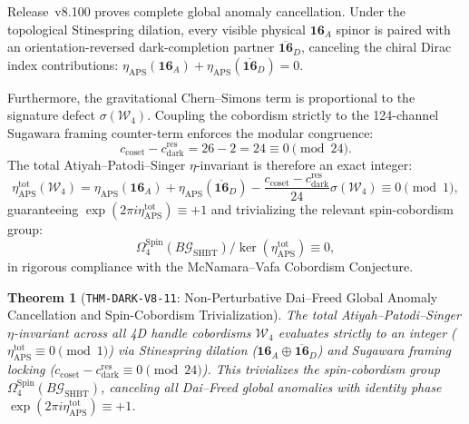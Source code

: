 \documentclass[11pt,onecolumn]{article}
\newtheorem{theorem}{Theorem}
\begin{document}
Release~v8.100 proves complete global anomaly cancellation. Under the topological Stinespring dilation, every visible physical $\mathbf{16}_A$ spinor is paired with an orientation-reversed dark-completion partner $\overline{\mathbf{16}}_D$, canceling the chiral Dirac index contributions: $\eta_{\text{APS}}(\mathbf{16}_A) + \eta_{\text{APS}}(\overline{\mathbf{16}}_D) = 0$.

Furthermore, the gravitational Chern--Simons term is proportional to the signature defect $\sigma(\mathcal{W}_4)$. Coupling the cobordism strictly to the 124-channel Sugawara framing counter-term enforces the modular congruence:
\begin{equation}
c_{\text{coset}} - c_{\text{dark}}^{\text{res}} = 26 - 2 = 24 \equiv 0 \pmod{24}.
\label{eq:v8_49}
\end{equation}
The total Atiyah--Patodi--Singer $\eta$-invariant is therefore an exact integer:
\begin{equation}
\eta_{\text{APS}}^{\text{tot}}(\mathcal{W}_4) = \eta_{\text{APS}}(\mathbf{16}_A) + \eta_{\text{APS}}(\overline{\mathbf{16}}_D) - \frac{c_{\text{coset}} - c_{\text{dark}}^{\text{res}}}{24}\sigma(\mathcal{W}_4) \equiv 0 \pmod 1,
\label{eq:v8_50}
\end{equation}
guaranteeing $\exp(2\pi i \eta_{\text{APS}}^{\text{tot}}) \equiv +1$ and trivializing the relevant spin-cobordism group:
\begin{equation}
\Omega_4^{\text{Spin}}(B\mathcal{G}_{\text{SHBT}}) / \ker(\eta_{\text{APS}}^{\text{tot}}) \equiv 0,
\label{eq:v8_51}
\end{equation}
in rigorous compliance with the McNamara--Vafa Cobordism Conjecture.

\begin{theorem}[\texttt{THM-DARK-V8-11}: Non-Perturbative Dai--Freed Global Anomaly Cancellation and Spin-Cobordism Trivialization]
\label{thm:dark_v8_11}
The total Atiyah--Patodi--Singer $\eta$-invariant across all 4D handle cobordisms $\mathcal{W}_4$ evaluates strictly to an integer ($\eta_{\text{APS}}^{\text{tot}} \equiv 0 \pmod 1$) via Stinespring dilation ($\mathbf{16}_A \oplus \overline{\mathbf{16}}_D$) and Sugawara framing locking ($c_{\text{coset}} - c_{\text{dark}}^{\text{res}} \equiv 0 \pmod{24}$). This trivializes the spin-cobordism group $\Omega_4^{\text{Spin}}(B\mathcal{G}_{\text{SHBT}})$, canceling all Dai--Freed global anomalies with identity phase $\exp(2\pi i \eta_{\text{APS}}^{\text{tot}}) \equiv +1$.
\end{theorem}
\end{document}
